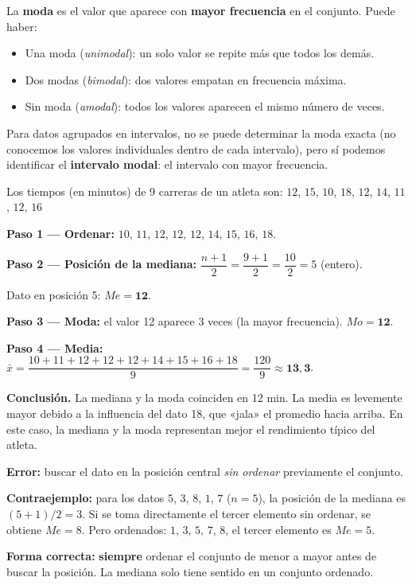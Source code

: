 \documentclass[11pt, letterpaper]{article}
\begin{document}
\begin{tcolorbox}[importantbox, title={Moda $Mo$}]
La \textbf{moda} es el valor que aparece con \textbf{mayor frecuencia} en el conjunto. Puede haber:
\begin{itemize}
  \item Una moda (\textit{unimodal}): un solo valor se repite más que todos los demás.
  \item Dos modas (\textit{bimodal}): dos valores empatan en frecuencia máxima.
  \item Sin moda (\textit{amodal}): todos los valores aparecen el mismo número de veces.
\end{itemize}

Para datos agrupados en intervalos, no se puede determinar la moda exacta (no conocemos los valores individuales dentro de cada intervalo), pero sí podemos identificar el \textbf{intervalo modal}: el intervalo con mayor frecuencia.
\end{tcolorbox}

\begin{tcolorbox}[examplebox, title={Ej. 8. Mediana y moda}]
Los tiempos (en minutos) de 9 carreras de un atleta son:
$12$, $15$, $10$, $18$, $12$, $14$, $11$, $12$, $16$

\textbf{Paso 1 --- Ordenar:} $10$, $11$, $12$, $12$, $12$, $14$, $15$, $16$, $18$.
\medskip

\textbf{Paso 2 --- Posición de la mediana:} $\dfrac{n+1}{2} = \dfrac{9+1}{2} = \dfrac{10}{2} = 5$ (entero).

  Dato en posición 5: $Me = \mathbf{12}$.
\medskip

\textbf{Paso 3 --- Moda:} el valor 12 aparece 3 veces (la mayor frecuencia). $Mo = \mathbf{12}$.
\medskip

\textbf{Paso 4 --- Media:} $\bar{x} = \dfrac{10+11+12+12+12+14+15+16+18}{9} = \dfrac{120}{9} \approx \mathbf{13{,}3}$.
\medskip

\noindent\textbf{Conclusión.} La mediana y la moda coinciden en 12 min. La media es levemente mayor debido a la influencia del dato 18, que «jala» el promedio hacia arriba. En este caso, la mediana y la moda representan mejor el rendimiento típico del atleta.

\end{tcolorbox}

\begin{tcolorbox}[warningbox, title={Error frecuente: olvidar ordenar los datos antes de calcular la mediana}]
\textbf{Error:} buscar el dato en la posición central \textit{sin ordenar} previamente el conjunto.

\medskip

\textbf{Contraejemplo:} para los datos $5$, $3$, $8$, $1$, $7$ ($n=5$), la posición de la mediana es $(5+1)/2 = 3$. Si se toma directamente el tercer elemento sin ordenar, se obtiene $Me = 8$. Pero ordenados: $1$, $3$, $5$, $7$, $8$, el tercer elemento es $Me = 5$.

\medskip

\textbf{Forma correcta:} \textbf{siempre} ordenar el conjunto de menor a mayor antes de buscar la posición. La mediana solo tiene sentido en un conjunto ordenado.
\end{tcolorbox}
\end{document}
